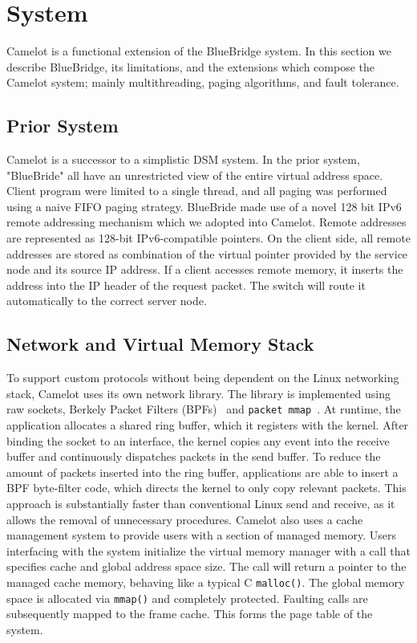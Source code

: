 \section{System} \label{sec:system}
Camelot is a functional extension of the BlueBridge system. In this section we
describe BlueBridge, its limitations, and the extensions which compose the
Camelot system; mainly multithreading, paging algorithms, and fault tolerance.
\subsection{Prior System} Camelot is a successor to a
simplistic DSM system. In the prior system, "BlueBride" all have an
unrestricted view of the entire virtual address space.  Client program were
limited to a single thread, and all paging was performed using a naive FIFO
paging strategy. BlueBride made use of a novel 128 bit IPv6 remote addressing
mechanism which we adopted into Camelot. Remote addresses are represented as
128-bit IPv6-compatible pointers. On the client side, all remote addresses are
stored as combination of the virtual pointer provided by the service node and
its source IP address. If a client accesses remote memory, it inserts the
address into the IP header of the request packet. The switch will route it
automatically to the correct server node.

\subsection{Network and Virtual Memory Stack} To support custom protocols
without being dependent on the Linux networking stack, Camelot uses its own
network library. The library is implemented using raw sockets, Berkely Packet
Filters (BPFs)~\cite{bpf} and \texttt{packet mmap}~\cite{packet_mmap}.  At
runtime, the application allocates a shared ring buffer, which it registers
with the kernel.  After binding the socket to an interface, the kernel copies
any event into the receive buffer and continuously dispatches packets in the
send buffer. To reduce the amount of packets inserted into the ring buffer,
applications are able to insert a BPF byte-filter code, which directs the
kernel to only copy relevant packets. This approach is substantially faster
than conventional Linux send and receive, as it allows the removal of
unnecessary procedures.
Camelot also uses a cache management system to provide users with a section of
managed memory. Users interfacing with the system initialize the virtual memory
manager with a call that specifies cache and global address space size. The
call will return a pointer to the managed cache memory, behaving like a typical
C \texttt{malloc()}. The global memory space is allocated via \texttt{mmap()}
and completely protected. Faulting calls are subsequently mapped to the frame
cache. This forms the page table of the system. 

